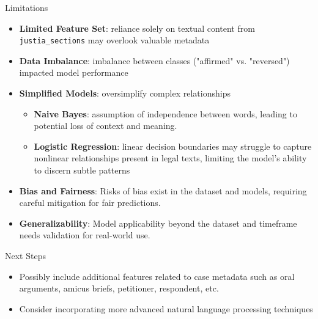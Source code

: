 \documentclass{beamer}
\begin{document}
\begin{frame}{Limitations}
\begin{itemize}
    \item \textbf{Limited Feature Set}: reliance solely on textual content from \texttt{justia\_sections} may overlook valuable metadata
    \item \textbf{Data Imbalance}: imbalance between classes ("affirmed" vs. "reversed") impacted model performance
    \item \textbf{Simplified Models}: oversimplify complex relationships
        \begin{itemize}
            \item \textbf{Naive Bayes}: assumption of independence between words, leading to potential loss of context and meaning.
            \item \textbf{Logistic Regression}: linear decision boundaries may struggle to capture nonlinear relationships present in legal texts, limiting the model's ability to discern subtle patterns
        \end{itemize}
    \item \textbf{Bias and Fairness}: Risks of bias exist in the dataset and models, requiring careful mitigation for fair predictions.
    \item \textbf{Generalizability}: Model applicability beyond the dataset and timeframe needs validation for real-world use.
\end{itemize}
\end{frame}


\begin{frame}{Next Steps}
\begin{itemize}
    \item Possibly include additional features related to case metadata such as oral arguments, amicus briefs, petitioner, respondent, etc.
    \item Consider incorporating more advanced natural language processing techniques
\end{itemize}
\end{frame}
\end{document}
